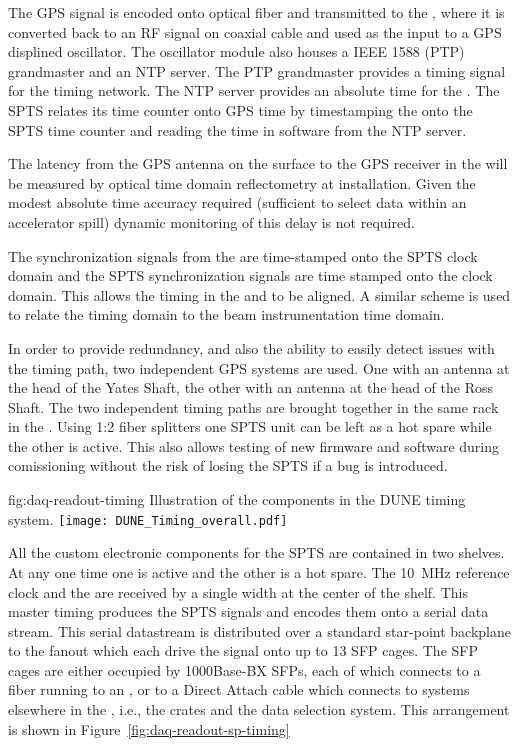 The GPS signal is encoded onto optical fiber and transmitted to the
, where it is converted back to an RF signal on coaxial cable and
used as the input to a GPS displined oscillator. The oscillator module
also houses a IEEE 1588 (PTP) grandmaster and an NTP server. The PTP
grandmaster provides a timing signal for the  
timing network. The NTP server provides an absolute time for the
. The SPTS relates its time counter onto GPS time by
timestamping the  onto the SPTS time counter and reading
the time in software from the NTP server.

The latency from the GPS antenna on the surface to the GPS receiver in
the  will be measured by optical time domain reflectometry at
installation. Given the modest absolute time accuracy required
(sufficient to select data within an accelerator spill) dynamic
monitoring of this delay is not required.

The  synchronization signals from the   are
time-stamped onto the SPTS clock domain and the SPTS synchronization
signals are time stamped onto the  clock domain. This allows
the timing in the  and   to be
aligned. A similar scheme is used to relate the 
 timing domain to the beam instrumentation
 time domain.

In order to provide redundancy, and also the ability to easily detect
issues with the timing path, two independent GPS systems are used. One
with an antenna at the head of the Yates Shaft, the other with an
antenna at the head of the Ross Shaft. The two independent timing
paths are brought together in the same rack in the . Using 1:2
fiber splitters one SPTS unit can be left as a hot spare while the
other is active. This also allows testing of new firmware and software
during comissioning without the risk of losing the SPTS if a bug is
introduced.


\begin{dunefigure}{fig:daq-readout-timing}
  {Illustration of the components in the DUNE timing system.}
\texttt{[image: DUNE\_Timing\_overall.pdf]}
\end{dunefigure}

All the custom electronic components for the SPTS are contained in two
 shelves. At any one time one is active and the other is a
hot spare. The \SI{10}{\MHz} reference clock and the  are received
by a single width  at the center of the  shelf. This
master timing  produces the SPTS signals and encodes them onto a
serial data stream. This serial datastream is distributed over a
standard star-point backplane to the fanout  which each drive the
signal onto up to \num{13} SFP cages. The SFP cages are either occupied by
1000Base-BX SFPs, each of which connects to a fiber running to an ,
or to a Direct Attach cable which connects to systems elsewhere in the
,  i.e., the  crates and the data selection system. This
arrangement is shown in Figure~\ref{fig:daq-readout-sp-timing}


